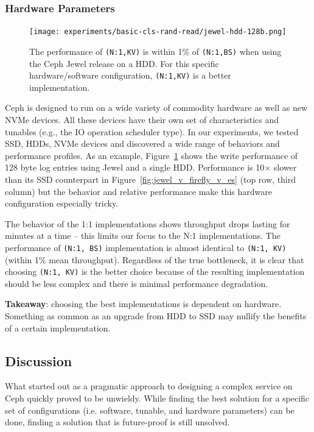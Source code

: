 \documentclass[10pt,twocolumn]{article}
\begin{document}
\subsubsection{Hardware Parameters}

\begin{figure}[t]
	\centering
	\texttt{[image: experiments/basic-cls-rand-read/jewel-hdd-128b.png]}
	\caption{The performance of \texttt{(N:1,KV)} is within 1\% of \texttt{(N:1,BS)} when using the Ceph Jewel release on a HDD. For this specific hardware/software configuration, \texttt{(N:1,KV)} is a better implementation.}
	\label{fig:jewel-hdd-128b}
\end{figure}

Ceph is designed to run on a wide variety of commodity hardware as well as new
NVMe devices. All these devices have their own set of characteristics and
tunables (e.g., the IO operation scheduler type). In our experiments, we tested
SSD, HDDs, NVMe devices and discovered a wide range of behaviors and
performance profiles. As an example, Figure~\ref{fig:jewel-hdd-128b} shows the
write performance of 128 byte log entries using Jewel and a single HDD.
Performance is 10\(\times\) slower than its SSD counterpart in
Figure~\ref{fig:jewel_v_firefly_v_es} (top row, third column) but the behavior
and relative performance make this hardware configuration especially tricky.

The behavior of the 1:1 implementations shows throughput drops lasting for
minutes at a time -- this limits our focus to the N:1 implementations. The
performance of \texttt{(N:1, BS)} implementation is almost identical to
\texttt{(N:1, KV)} (within 1\% mean throughput). Regardless of the true
bottleneck, it is clear that choosing \texttt{(N:1, KV)} is the better choice
because of the resulting implementation should be less complex and there is
minimal performance degradation.

\textbf{Takeaway}: choosing the best implementations is dependent on hardware.
Something as common as an upgrade from HDD to SSD may nullify the benefits of a
certain implementation. 

\subsection{Discussion}

What started out as a pragmatic approach to designing a complex service on Ceph
quickly proved to be unwieldy. While finding the best solution for a specific
set of configurations (i.e. software, tunable, and hardware parameters) can be
done, finding a solution that is future-proof is still unsolved. 
\end{document}
